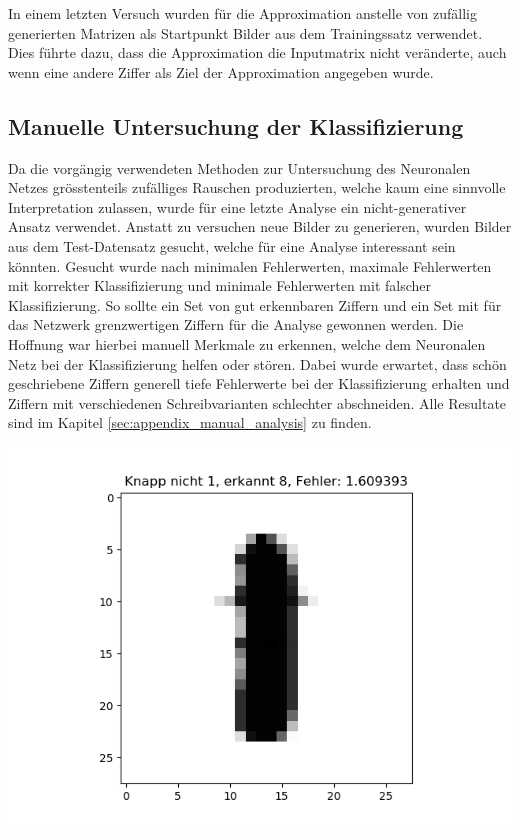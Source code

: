 \documentclass[Interploate_hadwritten_Digits.tex]{subfiles}
\begin{document}
	In einem letzten Versuch wurden für die Approximation anstelle von zufällig generierten Matrizen als Startpunkt Bilder aus dem Trainingssatz verwendet. Dies führte dazu, dass die Approximation die Inputmatrix nicht veränderte, auch wenn eine andere Ziffer als Ziel der Approximation angegeben wurde.
	
	\subsection{Manuelle Untersuchung der Klassifizierung}
	Da die vorgängig verwendeten Methoden zur Untersuchung des Neuronalen Netzes grösstenteils zufälliges Rauschen produzierten, welche kaum eine sinnvolle Interpretation zulassen, wurde für eine letzte Analyse ein nicht-generativer Ansatz verwendet. Anstatt zu versuchen neue Bilder zu generieren, wurden Bilder aus dem Test-Datensatz gesucht, welche für eine Analyse interessant sein könnten. Gesucht wurde nach minimalen Fehlerwerten, maximale Fehlerwerten mit korrekter Klassifizierung und minimale Fehlerwerten mit falscher Klassifizierung. So sollte ein Set von gut erkennbaren Ziffern und ein Set mit für das Netzwerk grenzwertigen Ziffern für die Analyse gewonnen werden. Die Hoffnung war hierbei manuell Merkmale zu erkennen, welche dem Neuronalen Netz bei der Klassifizierung helfen oder stören. Dabei wurde erwartet, dass schön geschriebene Ziffern generell tiefe Fehlerwerte bei der Klassifizierung erhalten und Ziffern mit verschiedenen Schreibvarianten schlechter abschneiden. Alle Resultate sind im Kapitel \ref{sec:appendix_manual_analysis} zu finden.
	\begin{Figure}
		\centering
		\includegraphics[width=\linewidth]{img/classification_analysis/flop_1_1}
		\label{fig:dig_flop_thick_line}
	\end{Figure}
\end{document}
